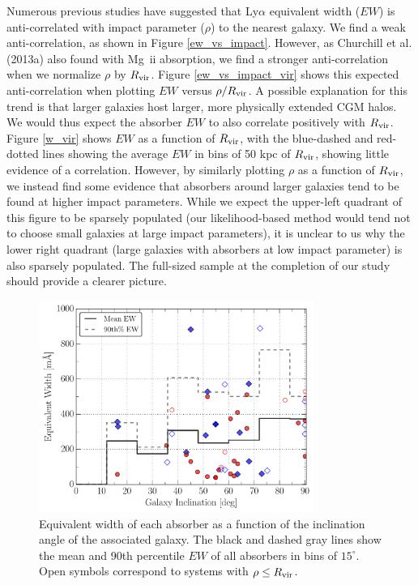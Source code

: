 Numerous previous studies have suggested that Ly$\alpha$ equivalent width ($EW$) is anti-correlated with impact parameter ($\rho$) to the nearest galaxy. We find a weak anti-correlation, as shown in Figure \ref{ew_vs_impact}. However, as Churchill et al. (2013a) also found with Mg \,{\sc ii} absorption, we find a stronger anti-correlation when we normalize $\rho$ by $R_{\rm vir}$. Figure \ref{ew_vs_impact_vir} shows this expected anti-correlation when plotting $EW$ versus $\rho/R_{\rm vir}$. A possible explanation for this trend is that larger galaxies host larger, more physically extended CGM halos. We would thus expect the absorber $EW$ to also correlate positively with $R_{\rm vir}$. Figure \ref{w_vir} shows $EW$ as a function of $R_{\rm vir}$, with the blue-dashed and red-dotted lines showing the average $EW$ in bins of 50 kpc of $R_{\rm vir}$, showing little evidence of a correlation. However, by similarly plotting $\rho$ as a function of $R_{\rm vir}$, we instead find some evidence that absorbers around larger galaxies tend to be found at higher impact parameters. While we expect the upper-left quadrant of this figure to be sparsely populated (our likelihood-based method would tend not to choose small galaxies at large impact parameters), it is unclear to us why the lower right quadrant (large galaxies with absorbers at low impact parameter) is also sparsely populated. The full-sized sample at the completion of our study should provide a clearer picture.


\begin{figure}[h!]
        \centering
        \includegraphics[width=0.8\textwidth]{Chap3/figures/fig8.pdf}
        \caption{\small{Equivalent width of each absorber as a function of the inclination angle of the associated galaxy. The black and dashed gray lines show the mean and 90th percentile $EW$ of all absorbers in bins of $15^{\circ}$. Open symbols correspond to systems with $\rho \leq R_{\rm vir}$.}}
        \label{ew_vs_inclination}
        \vspace{2pt}
\end{figure}

